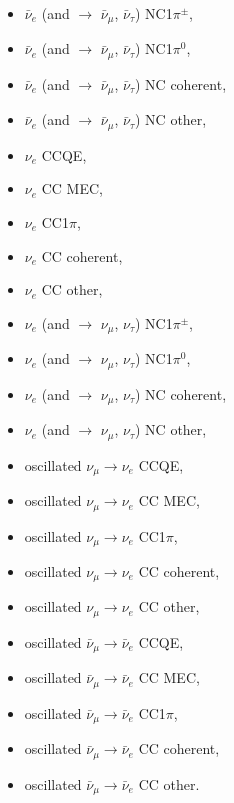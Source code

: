 \begin{itemize}
\item  $\bar{\nu}_{e}$ (and $\rightarrow$ $\bar{\nu}_{\mu}$, $\bar{\nu}_{\tau}$) NC1$\pi^{\pm}$,
\item  $\bar{\nu}_{e}$ (and $\rightarrow$ $\bar{\nu}_{\mu}$, $\bar{\nu}_{\tau}$) NC1$\pi^{0}$,
\item  $\bar{\nu}_{e}$ (and $\rightarrow$ $\bar{\nu}_{\mu}$, $\bar{\nu}_{\tau}$) NC coherent,
\item  $\bar{\nu}_{e}$ (and $\rightarrow$ $\bar{\nu}_{\mu}$, $\bar{\nu}_{\tau}$) NC other,
\item  $\nu_{e}$ CCQE, 
\item  $\nu_{e}$ CC MEC,
\item  $\nu_{e}$ CC1$\pi$,
\item  $\nu_{e}$ CC coherent,
\item  $\nu_{e}$ CC other,
\item  $\nu_{e}$ (and $\rightarrow$ $\nu_{\mu}$, $\nu_{\tau}$) NC1$\pi^{\pm}$,
\item  $\nu_{e}$ (and $\rightarrow$ $\nu_{\mu}$, $\nu_{\tau}$) NC1$\pi^{0}$,
\item  $\nu_{e}$ (and $\rightarrow$ $\nu_{\mu}$, $\nu_{\tau}$) NC coherent,
\item  $\nu_{e}$ (and $\rightarrow$ $\nu_{\mu}$, $\nu_{\tau}$) NC other,
\item  oscillated $\nu_{\mu} \rightarrow \nu_{e}$ CCQE,
\item  oscillated $\nu_{\mu} \rightarrow \nu_{e}$ CC MEC,
\item  oscillated $\nu_{\mu} \rightarrow \nu_{e}$ CC1$\pi$,
\item  oscillated $\nu_{\mu} \rightarrow \nu_{e}$ CC coherent,
\item  oscillated $\nu_{\mu} \rightarrow \nu_{e}$ CC other,
\item  oscillated $\bar{\nu}_{\mu} \rightarrow \bar{\nu}_{e}$ CCQE,
\item  oscillated $\bar{\nu}_{\mu} \rightarrow \bar{\nu}_{e}$ CC MEC,
\item  oscillated $\bar{\nu}_{\mu} \rightarrow \bar{\nu}_{e}$ CC1$\pi$,
\item  oscillated $\bar{\nu}_{\mu} \rightarrow \bar{\nu}_{e}$ CC coherent,
\item  oscillated $\bar{\nu}_{\mu} \rightarrow \bar{\nu}_{e}$ CC other.

\end{itemize}
